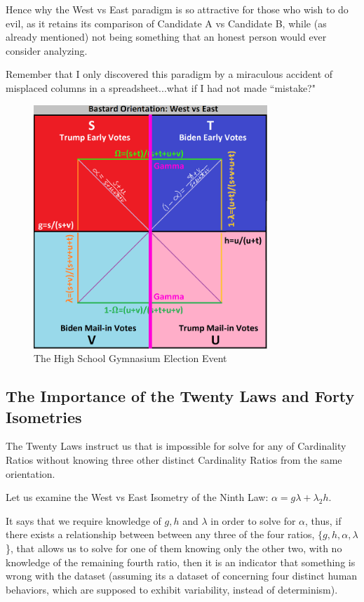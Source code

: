 Hence why the West vs East paradigm is so attractive for those who wish to do evil, as it retains its comparison of Candidate A vs Candidate B, while (as already mentioned) not being something that an honest person would ever consider analyzing.

Remember that I only discovered this paradigm by a miraculous accident of misplaced columns in a spreadsheet...what if I had not made ``mistake?"
\begin{figure}[bp!]
\begin{center}
\caption{The High School Gymnasium Election Event}
\includegraphics[width=250pt]{West vs East.png}
\end{center}
\end{figure}
\newpage
\subsection{The Importance of the Twenty Laws and Forty Isometries}

The Twenty Laws instruct us that is impossible for solve for any of Cardinality Ratios without knowing three other distinct Cardinality Ratios from the same orientation.

Let us examine the West vs East Isometry of the Ninth Law: $\alpha=g\lambda+\lambda_{2}h$.

It says that we require knowledge of $g,h$ and $\lambda$ in order to solve for $\alpha$, thus, if there exists a relationship between between any three of the four ratios, $\{g,h,\alpha,\lambda$\}, that allows us to solve for one of them knowing only the other two, with no knowledge of the remaining fourth ratio, then it is an indicator that something is wrong with the dataset (assuming its a dataset of concerning four distinct human behaviors, which are supposed to exhibit variability, instead of determinism).

